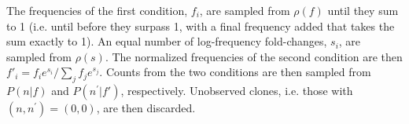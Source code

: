 The frequencies of the first condition, $f_i$, are sampled from $\rho(f)$ until they sum to 1 (i.e. until before they surpass 1, with a final frequency added that takes the sum exactly to 1). An equal number of log-frequency fold-changes, $s_i$, are sampled from $\rho(s)$. The normalized frequencies of the second condition are then $f'_i=f_ie^{s_i}/\sum_j f_je^{s_j}$.  Counts from the two conditions are then sampled from $P(n|f)$ and $P(n^{\prime}|f')$, respectively. Unobserved clones, i.e. those with $(n,n^{\prime})=(0,0)$, are then discarded.

% 
% 
% 
